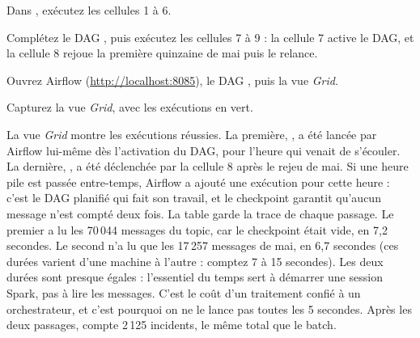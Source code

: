 \begin{obtenir}
  \item Dans , exécutez les cellules 1 à 6.
  \item Complétez le DAG , puis exécutez les cellules 7 à 9 : la cellule 7 active le DAG, et la cellule 8 rejoue la première quinzaine de mai puis le relance.
  \item Ouvrez Airflow (\url{http://localhost:8085}), le DAG , puis la vue \emph{Grid}.
  \item Capturez la vue \emph{Grid}, avec les exécutions en vert.
\end{obtenir}
\begin{lecture}
La vue \emph{Grid} montre les exécutions réussies. La première, , a été lancée par
Airflow lui-même dès l'activation du DAG, pour l'heure qui venait de s'écouler. La dernière,
, a été déclenchée par la cellule 8 après le rejeu de mai. Si une heure pile est passée
entre-temps, Airflow a ajouté une exécution  pour cette heure : c'est le DAG
planifié qui fait son travail, et le checkpoint garantit qu'aucun message n'est compté deux fois. La table
 garde la trace de chaque passage. Le premier a lu les 70\,044
messages du topic, car le checkpoint  était vide, en 7,2 secondes. Le
second n'a lu que les 17\,257 messages de mai, en 6,7 secondes (ces durées varient d'une machine à
l'autre : comptez 7 à 15 secondes). Les deux durées sont presque égales :
l'essentiel du temps sert à démarrer une session Spark, pas à lire les messages. C'est le coût d'un
traitement confié à un orchestrateur, et c'est pourquoi on ne le lance pas toutes les 5 secondes.
Après les deux passages,  compte 2\,125 incidents, le même total que
le batch.
\end{lecture}

